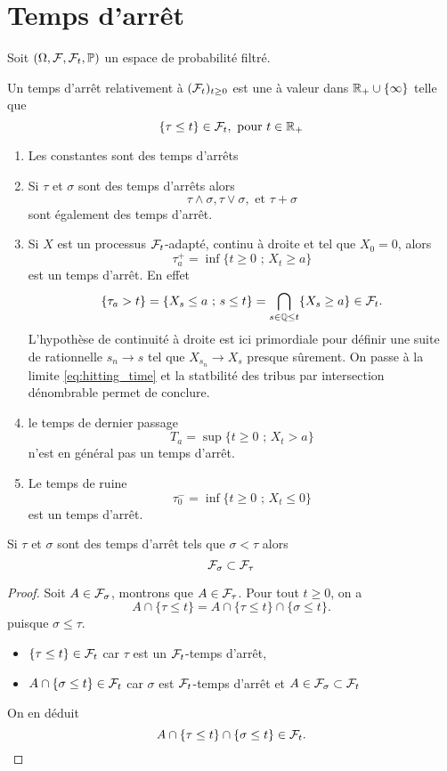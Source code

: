 \section{Temps d'arrêt}\label{sec:temps_arret_contd}
Soit $(\Omega,\mathcal{F}, \mathcal{F}_t,\mathbb{P})$ un espace de probabilité filtré.
\begin{definition}
Un temps d'arrêt relativement à $(\mathcal{F}_t)_{t\geq0}$ est une \va à valeur dans $\mathbb{R}_+\cup\{\infty\}$ telle que 
$$
\{\tau\leq t\}\in\mathcal{F}_t,\text{ pour }t\in\mathbb{R}_+
$$

\end{definition}
\begin{ex}
\begin{enumerate}
    \item Les constantes sont des temps d'arrêts
    \item Si $\tau$ et $\sigma$ sont des temps d'arrêts alors 
    $$
    \tau\land\sigma, \tau\vee\sigma,\text{ et }\tau + \sigma
    $$
    sont également des temps d'arrêt.
    \item Si $X$ est un processus $\mathcal{F}_t$-adapté, continu à droite et tel que $X_0 = 0$, alors 
    $$
    \tau_a^+ = \inf\{t\geq 0\text{ ; }X_t\geq a\}
    $$
    est un temps d'arrêt. En effet
    \begin{equation}\label{eq:hitting_time}
    \{\tau_a>t\} = \{X_s\leq a\text{ ; }s\leq t\} = \bigcap_{s\in\mathbb{Q}\leq t}\{X_s\geq a\}\in\mathcal{F}_t.
    \end{equation}
    L'hypothèse de continuité à droite est ici primordiale pour définir une suite de rationnelle $s_n\rightarrow s$ tel que $X_{s_n}\rightarrow X_s$ presque sûrement. On passe à la limite \eqref{eq:hitting_time} et la statbilité des tribus par intersection dénombrable permet de conclure.
    \item le temps de dernier passage 
        $$
    T_a = \sup\{t\geq 0\text{ ; }X_t>a\}
    $$
    n'est en général pas un temps d'arrêt.
    \item Le temps de ruine
    $$
    \tau_0^- = \inf\{t\geq 0\text{ ; }X_t\leq 0\}
    $$
    est un temps d'arrêt.
\end{enumerate}
\end{ex}
\begin{prop}
Si $\tau$ et $\sigma$ sont des temps d'arrêt tels que $\sigma<\tau$ alors
$$
\mathcal{F}_\sigma\subset\mathcal{F}_\tau
$$
\end{prop}
\begin{proof}
Soit $A\in\mathcal{F}_\sigma$, montrons que $A\in\mathcal{F}_\tau$. Pour tout $t\geq 0$, on a 
$$
A\cap\{\tau\leq t\} = A\cap\{\tau\leq t\}\cap\{\sigma\leq t\}.
$$
puisque $\sigma\leq \tau$. 
\begin{itemize}
\item $\{\tau\leq t\}\in\mathcal{F}_t$ car $\tau$ est un $\mathcal{F}_t$-temps d'arrêt,
\item $A\cap\{\sigma\leq t\}\in\mathcal{F}_t$ car $\sigma$ est $\mathcal{F}_t$-temps d'arrêt et $A\in\mathcal{F}_\sigma\subset\mathcal{F}_t$
\end{itemize}
On en déduit 
$$
A\cap\{\tau\leq t\}\cap\{\sigma\leq t\}\in\mathcal{F}_t.
$$
\end{proof}
